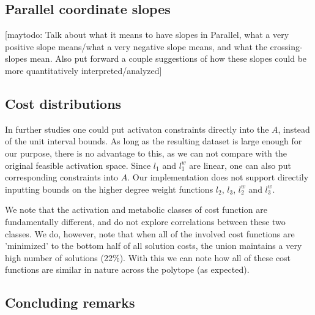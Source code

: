 \subsection{Parallel coordinate slopes} %
\label{sec:parallel_coordinate_slopes}
[maytodo: Talk about what it means to have slopes in Parallel, what a very positive slope means/what a very negative slope means, and what the crossing-slopes mean. Also put forward a couple suggestions of how these slopes could be more quantitatively interpreted/analyzed]

\subsection{Cost distributions} %
\label{sec:cost_distributions}
In further studies one could put activaton constraints directly into the $A$, instead of the unit interval bounds. As long as the resulting dataset is large enough for our purpose, there is no advantage to this, as we can not compare with the original feasible activation space. Since $l_1$ and $l_1^w$ are linear, one can also put corresponding constraints into $A$. Our implementation does not support directily inputting bounds on the higher degree weight functions $l_2$, $l_3$, $l_2^w$ and $l_3^w$.

We note that the activation and metabolic classes of cost function are fundamentally different, and do not explore correlations between these two classes. We do, however, note that when all of the involved cost functions are 'minimized' to the bottom half of all solution costs, the union maintains a very high number of solutions (22\%). With this we can note how all of these cost functions are similar in nature across the polytope (as expected).

\subsection{Concluding remarks} %
\label{ssub:concluding_remarks}

